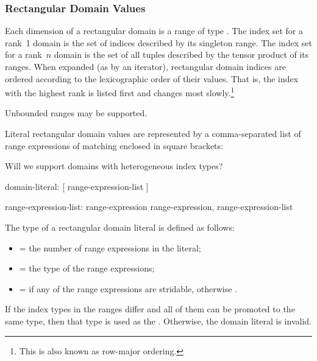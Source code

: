 \subsubsection{Rectangular Domain Values}
\label{Rectangular_Domain_Values}

Each dimension of a rectangular domain is a range of
type   .  The index set for a rank~1 domain is the set of indices
described by its singleton range.  The index set for a rank~$n$
domain is the set of all  tuples described by the
tensor product of its ranges.  When expanded (as by an iterator), rectangular domain indices are ordered
according to the lexicographic order of their values.  That is, the index with
the highest rank is listed first and changes most slowly.\footnote{This is also
known as row-major ordering.}



\begin{future}
Unbounded ranges may be supported.
\end{future}


Literal rectangular domain values are represented by a comma-separated
list of range expressions of matching  enclosed in
square brackets:

\begin{future}
Will we support domains with heterogeneous index types?
\end{future}

\begin{syntax}
domain-literal:
  [ range-expression-list ]

range-expression-list:
  range-expression
  range-expression, range-expression-list
\end{syntax}

\noindent The type of a rectangular domain literal is defined as follows:

\begin{itemize}
\item {} = the number of range expressions in the literal;
\item {} = the type of the range expressions;
\item {} =  if any of the range expressions
are stridable, otherwise .
\end{itemize}
\noindent If the index types in the ranges differ and all of them can be
promoted to the same type, then that type is used as the .
Otherwise, the domain literal is invalid.

